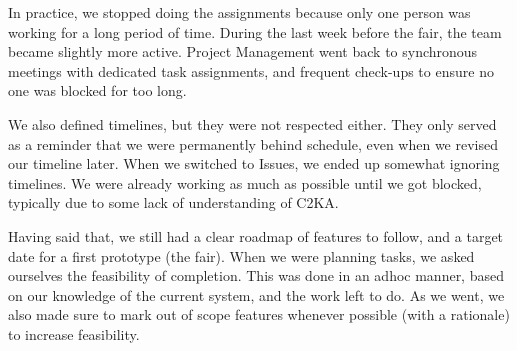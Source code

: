 In practice, we stopped doing the assignments because only one person was working for a long period of time.
During the last week before the fair, the team became slightly more active.
Project Management went back to synchronous meetings with dedicated task assignments,
and frequent check-ups to ensure no one was blocked for too long.

We also defined timelines, but they were not respected either.
They only served as a reminder that we were permanently behind schedule, even when we revised our timeline later.
When we switched to Issues, we ended up somewhat ignoring timelines.
We were already working as much as possible until we got blocked, typically due to some lack of understanding of C2KA\@.

Having said that, we still had a clear roadmap of features to follow, and a target date for a first prototype (the fair).
When we were planning tasks, we asked ourselves the feasibility of completion.
This was done in an adhoc manner, based on our knowledge of the current system, and the work left to do.
As we went, we also made sure to mark out of scope features whenever possible (with a rationale) to increase feasibility.
